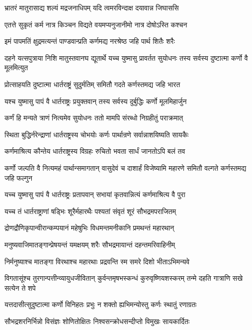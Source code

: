 \twolineshloka
{भ्रातरं मातुरासाद्य शल्यं मद्रजनाधिपम्}
{यदि त्वमरविन्दाक्ष दयावान्न जिघाससि}


\twolineshloka
{एतत्ते सुकृतं कर्म नात्र किञ्चन विद्यते}
{वयमप्यनुजानीमो नात्र दोषोऽस्ति कश्चन}


\twolineshloka
{इमं पापमतिं क्षुद्रमत्यन्तं पाण्डवान्प्रति}
{कर्णमद्य नरश्रेष्ठ जहि पार्थ शितैः शरैः}


\threelineshloka
{दहने यत्सपुत्राया निशि मातुस्तवानघ}
{द्यूतार्थे यच्च युष्मासु प्रावर्तत सुयोधनः}
{तस्य सर्वस्य दुष्टात्मा कर्णो वै मूलमित्युत}


\twolineshloka
{प्रोत्साहयति दुष्टात्मा धार्तराष्ट्रं सुदुर्मतिम्}
{समितौ गदते कर्णस्तमद्य जहि भारत}


\twolineshloka
{यश्च युष्मासु पापं वै धार्तराष्ट्रः प्रयुक्तवान्}
{तस्य सर्वस्य दुर्बुद्धिः कर्णो मूलमिहार्जुन}


\twolineshloka
{कर्णं हि मन्यते त्राणं नित्यमेव सुयोधनः}
{ततो मामपि संरब्धो निग्रहीतुं पराक्रमात्}


\twolineshloka
{स्थिता बुद्धिर्नरेन्द्राणां धार्तराष्ट्रस्य चोभयोः}
{कर्णः पार्थान्रणे सर्वान्नाशयिष्यति सायकैः}


\twolineshloka
{कर्णमाश्रित्य कौन्तेय धार्तराष्ट्रस्य विग्रहः}
{रुचितो भवता सार्धं जानतोऽपि बलं तव}


\threelineshloka
{कर्णो जल्पति वै नित्यमहं पार्थान्समागतान्}
{वासुदेवं च दाशार्हं विजेष्यामि महारणे}
{समितौ वल्गते कर्णस्तमद्य जहि फल्गुन}


\twolineshloka
{यच्च युष्मासु पापं वै धार्तराष्ट्रः प्रतापवान्}
{सभायां कृतवान्नित्यं कर्णमाश्रित्य वै पुरा}


\twolineshloka
{यच्च तं धार्तराष्ट्राणां षड्भिः शूरैर्महारथैः}
{पश्यतां संवृतं शूरं सौभद्रमपराजितम्}


\twolineshloka
{द्रोणद्रौणिकृपान्वीरान्कम्पयानं महेषुभिः}
{विधमन्तमनीकानि प्रमथन्तं महारथान्}


\twolineshloka
{मनुष्यवाजिमातङ्गान्प्रेषयन्तं यमक्षयम्}
{शरैः सौभद्रमायान्तं दहन्तमरिवाहिनीम्}


\twolineshloka
{निर्मनुष्याश्च मातङ्गा विरथाश्च महारथाः}
{प्रद्रवन्ति स्म समरे दिशो भीताऽभिमन्यवे}


\threelineshloka
{विगतासूंश्च तुरगान्पत्तीन्व्यायुधजीवितान्}
{कुर्वन्तमृषभस्कन्धं कुरुवृष्णियशस्करम्}
{तन्मे दहति गात्राणि सखे सत्येन ते शपे}


\twolineshloka
{यत्तदासीत्सुदुष्टात्मा कर्णो विनिहतः प्रभुः}
{न शक्तो ह्यभिमन्योस्तु कर्णः स्थातुं रणाग्रतः}


\twolineshloka
{सौभद्रशरनिर्भिन्नो विसंज्ञः शोणितोक्षितः}
{निश्वसन्क्रोधसन्दीप्तो विमुखः सायकार्दितः}


